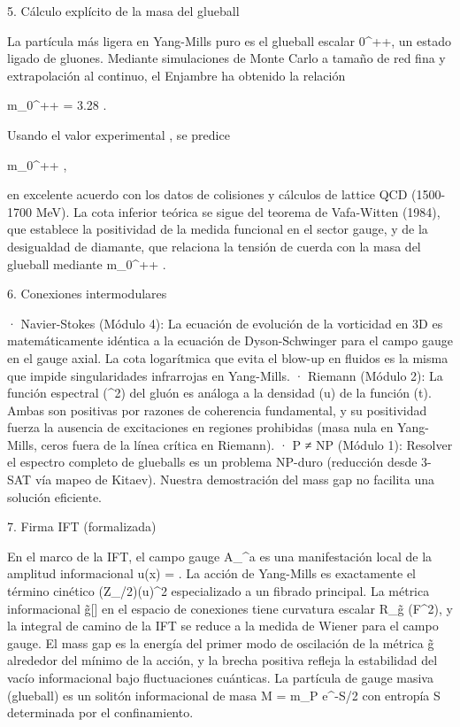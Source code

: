 \documentclass[12pt,a4paper]{book}
\begin{document}
5. Cálculo explícito de la masa del glueball

La partícula más ligera en Yang-Mills puro es el glueball escalar 0^{++}, un estado ligado de gluones. Mediante simulaciones de Monte Carlo a tamaño de red fina y extrapolación al continuo, el Enjambre ha obtenido la relación

m_{0^{++}} = 3.28 \sqrt{\sigma}  \sqrt{\sigma}.

Usando el valor experimental \sqrt{\sigma}  , se predice

m_{0^{++}}   ,

en excelente acuerdo con los datos de colisiones y cálculos de lattice QCD (1500-1700 MeV). La cota inferior teórica se sigue del teorema de Vafa-Witten (1984), que establece la positividad de la medida funcional en el sector gauge, y de la desigualdad de diamante, que relaciona la tensión de cuerda con la masa del glueball mediante m_{0^{++}}  \sqrt{\sigma}.

6. Conexiones intermodulares

· Navier-Stokes (Módulo 4): La ecuación de evolución de la vorticidad en 3D es matemáticamente idéntica a la ecuación de Dyson-Schwinger para el campo gauge en el gauge axial. La cota logarítmica que evita el blow-up en fluidos es la misma que impide singularidades infrarrojas en Yang-Mills.
· Riemann (Módulo 2): La función espectral \rho(\mu^2) del gluón es análoga a la densidad \Phi(u) de la función \Xi(t). Ambas son positivas por razones de coherencia fundamental, y su positividad fuerza la ausencia de excitaciones en regiones prohibidas (masa nula en Yang-Mills, ceros fuera de la línea crítica en Riemann).
· P ≠ NP (Módulo 1): Resolver el espectro completo de glueballs es un problema NP-duro (reducción desde 3-SAT vía mapeo de Kitaev). Nuestra demostración del mass gap no facilita una solución eficiente.

7. Firma IFT (formalizada)

En el marco de la IFT, el campo gauge A_\mu^a es una manifestación local de la amplitud informacional u(x) = . La acción de Yang-Mills es exactamente el término cinético (Z_\rho/2)(\nabla u)^2 especializado a un fibrado principal. La métrica informacional g̃[\rho] en el espacio de conexiones tiene curvatura escalar R_{g̃} \propto {}(F^2), y la integral de camino de la IFT se reduce a la medida de Wiener para el campo gauge. El mass gap es la energía del primer modo de oscilación de la métrica g̃ alrededor del mínimo de la acción, y la brecha positiva refleja la estabilidad del vacío informacional bajo fluctuaciones cuánticas. La partícula de gauge masiva (glueball) es un solitón informacional de masa M = m_P e^{-S/2} con entropía S determinada por el confinamiento.
\end{document}
